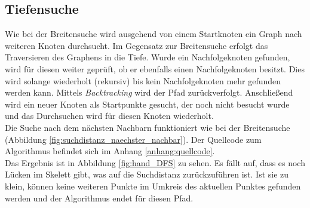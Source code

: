 \subsection{Tiefensuche}
\label{subsec:tiefensuche}
Wie bei der Breitensuche wird ausgehend von einem Startknoten ein Graph nach weiteren Knoten durchsucht. 
Im Gegensatz zur Breitensuche erfolgt das Traversieren des Graphens in die Tiefe. Wurde ein Nachfolgeknoten
gefunden, wird für diesen weiter geprüft, ob er ebenfalls einen Nachfolgeknoten besitzt. Dies wird
solange wiederholt (rekursiv) bis kein Nachfolgeknoten mehr gefunden werden kann. Mittels \emph{Backtracking} wird der Pfad zurückverfolgt. Anschließend wird ein neuer Knoten als Startpunkte gesucht, der noch nicht besucht wurde und das Durchsuchen wird für diesen Knoten wiederholt.\\
Die Suche nach dem nächsten Nachbarn funktioniert wie bei der Breitensuche (Abbildung \ref{fig:suchdistanz_naechster_nachbar}). Der Quellcode zum Algorithmus befindet sich im Anhang \ref{anhang:quellcode}. \\
Das Ergebnis ist in Abbildung \ref{fig:hand_DFS} zu sehen. Es fällt auf, dass es noch Lücken im Skelett gibt, was auf die Suchdistanz zurückzuführen ist. Ist sie zu klein, können keine weiteren Punkte im Umkreis des aktuellen Punktes gefunden werden und der Algorithmus endet für diesen Pfad. 
